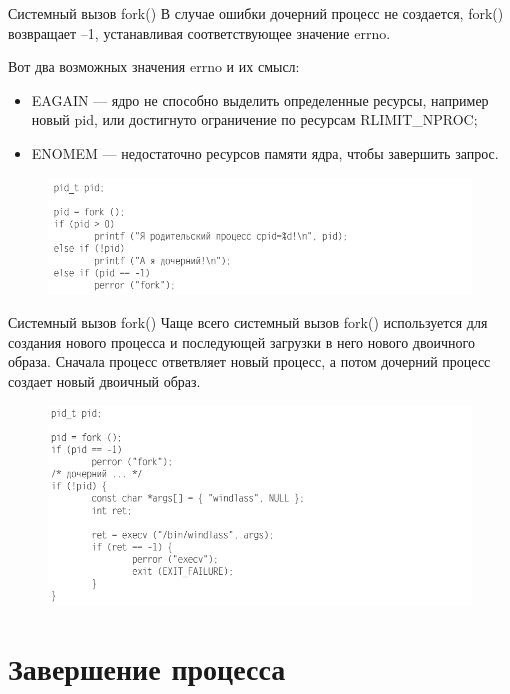 \documentclass{beamer}
\begin{document}
\begin{frame}{Системный вызов fork()}
В случае ошибки дочерний процесс не создается, fork() возвращает –1, устанавливая соответствующее значение errno. 

Вот два возможных значения errno и их
смысл:
\begin{itemize}
\item EAGAIN — ядро не способно выделить определенные ресурсы, например новый
pid, или достигнуто ограничение по ресурсам RLIMIT\_NPROC;
\item ENOMEM — недостаточно ресурсов памяти ядра, чтобы завершить запрос.
\end{itemize}
\begin{figure}[h]
\centering
\includegraphics[scale=0.5]{images/lec07-pic08.png}
\end{figure}
\end{frame}

\begin{frame}{Системный вызов fork()}
Чаще всего системный вызов fork() используется для создания нового процесса
и последующей загрузки в него нового двоичного образа.  Сначала процесс ответвляет новый процесс, а потом дочерний процесс создает новый двоичный образ.
\begin{figure}[h]
\centering
\includegraphics[scale=0.5]{images/lec07-pic09.png}
\end{figure}
\end{frame}

\section{Завершение процесса}
\end{document}
